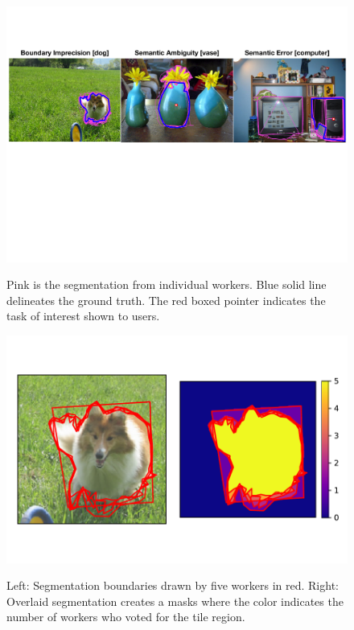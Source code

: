 \begin{figure}[ht!]
    \centering
    \RawFloats
    \begin{minipage}{0.65\textwidth}
    	\vspace{-20pt}
        \includegraphics[width=\textwidth]{plots/error_examples.pdf} %
        \caption{Pink is the segmentation from individual workers. Blue solid line delineates the ground truth. The red boxed pointer indicates the task of interest shown to users.}
        \vspace{-15pt}
        \label{error_examples}
    \end{minipage}
    \begin{minipage}{0.35\textwidth}
    	\vspace{-25pt}
        \includegraphics[width=\textwidth]{plots/tile_demo.pdf}
        \vspace{-35pt}
        \caption{Left: Segmentation boundaries drawn by five workers in red. Right: Overlaid segmentation creates a masks where the color indicates the number of workers who voted for the tile region.}
        \vspace{-20pt}
        \label{tile_demo}
    \end{minipage}\hfill
\end{figure}

